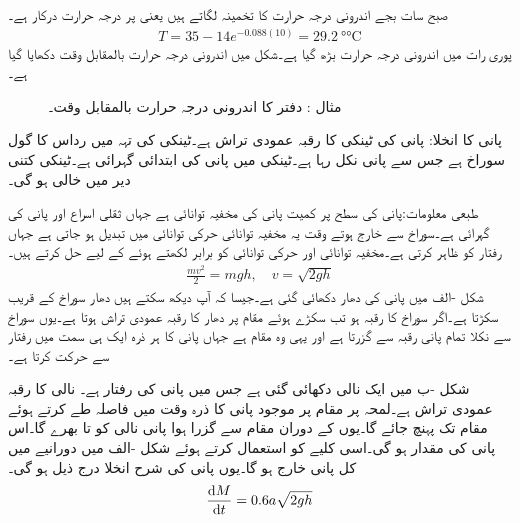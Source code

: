 صبح سات بجے اندرونی درجہ حرارت کا تخمینہ لگاتے ہیں یعنی  پر درجہ حرارت درکار ہے۔
\begin{align*}
T=35-14e^{-0.088(10)}=\SI{29.2}{\degree\celsius}
\end{align*} 
پوری رات میں اندرونی درجہ حرارت  بڑھ گیا ہے۔شکل  میں اندرونی درجہ حرارت بالمقابل وقت دکھایا گیا ہے۔
\begin{figure}
\centering
{}
\caption{مثال : دفتر کا اندرونی درجہ حرارت بالمقابل وقت۔}
\label{شکل_مثال_سادہ_اول_نیوٹن_قانون_ٹھنڈک}
\end{figure}
 \quad پانی کا انخلا:
پانی کی ٹینکی کا رقبہ عمودی تراش  ہے۔ٹینکی کی تہہ میں  رداس کا گول سوراخ ہے جس سے پانی نکل رہا ہے۔ٹینکی میں پانی کی ابتدائی گہرائی  ہے۔ٹینکی کتنی دیر میں خالی ہو گی۔

طبعی معلومات:پانی کی سطح پر  کمیت پانی کی مخفیہ توانائی  ہے جہاں  ثقلی اسراع اور  پانی کی گہرائی ہے۔سوراخ سے خارج ہوتے وقت یہ مخفیہ توانائی  حرکی توانائی  میں تبدیل ہو جاتی ہے جہاں  رفتار کو ظاہر کرتی ہے۔مخفیہ توانائی اور حرکی توانائی کو برابر لکھتے ہوئے  کے لیے حل کرتے ہیں۔
\begin{align*}
\frac{mv^2}{2}=mgh,\quad v=\sqrt{2gh}
\end{align*}
شکل -الف میں پانی کی دھار دکھائی گئی ہے۔جیسا کہ آپ دیکھ سکتے ہیں دھار سوراخ کے قریب سکڑتا ہے۔اگر سوراخ کا رقبہ  ہو تب سکڑے  ہوئے مقام پر دھار کا رقبہ عمودی تراش  ہوتا ہے۔یوں سوراخ سے نکلا تمام پانی رقبہ  سے گزرتا ہے اور یہی وہ مقام ہے جہاں پانی کا ہر ذرہ ایک ہی سمت میں رفتار  سے حرکت کرتا ہے۔

شکل -ب میں ایک نالی دکھائی گئی ہے جس میں پانی کی رفتار  ہے۔ نالی کا رقبہ عمودی تراش  ہے۔لمحہ  پر  مقام  پر موجود پانی کا ذرہ وقت  میں  فاصلہ طے کرتے ہوئے مقام  تک پہنچ جائے گا۔یوں  کے دوران مقام  سے گزرا ہوا پانی نالی کو  تا  بھرے گا۔اس پانی کی مقدار  ہو گی۔اسی کلیے کو استعمال کرتے ہوئے شکل -الف میں  دورانیے میں کل  پانی خارج ہو گا۔یوں پانی کی شرح انخلا درج ذیل ہو گی۔
 \begin{align}\label{مساوات_سادہ_اول_ٹورا_سلی}
\frac{\dif M}{\dif t}=0.6a\sqrt{2gh}
\end{align}
 
